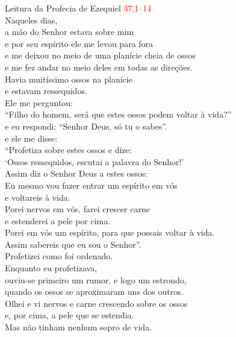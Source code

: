 \documentclass{book}
\begin{document}
\begin{flushleft}

    \vspace{0.2cm}
    Leitura da Profecia de Ezequiel
    \hspace{\fill}
    \textcolor{red}{37,1--14}
    \vspace{0.2cm} \\
    Naqueles dias, \\
    a mão do Senhor estava sobre mim \\
    e por seu espírito ele me levou para fora \\
    e me deixou no meio de uma planície cheia de ossos \\
    e me fez andar no meio deles em todas as direções. \\
    Havia muitíssimo ossos na planície \\
    e estavam ressequidos. \\
    Ele me perguntou: \\
    ``Filho do homem, será que estes ossos podem voltar à vida?'' \\
    e eu respondi: ``Senhor Deus, só tu o sabes''. \\
    e ele me disse: \\
    ``Profetiza sobre estes ossos e dize: \\
    `Ossos ressequidos, escutai a palavra do Senhor!' \\
    Assim diz o Senhor Deus a estes ossos: \\
    Eu mesmo vou fazer entrar um espírito em vós \\
    e voltareis à vida. \\
    Porei nervos em vós, farei crescer carne \\
    e estenderei a pele por cima. \\
    Porei em vós um espírito, para que possais voltar à vida. \\
    Assim sabereis que eu sou o Senhor''. \\
    Profetizei como foi ordenado. \\
    Enquanto eu profetizava, \\
    ouviu-se primeiro um rumor, e logo um estrondo, \\
    quando os ossos se aproximaram uns dos outros. \\
    Olhei e vi nervos e carne crescendo sobre os ossos \\
    e, por cima, a pele que se estendia. \\
    Mas não tinham nenhum sopro de vida. \\

\end{flushleft}
\end{document}
